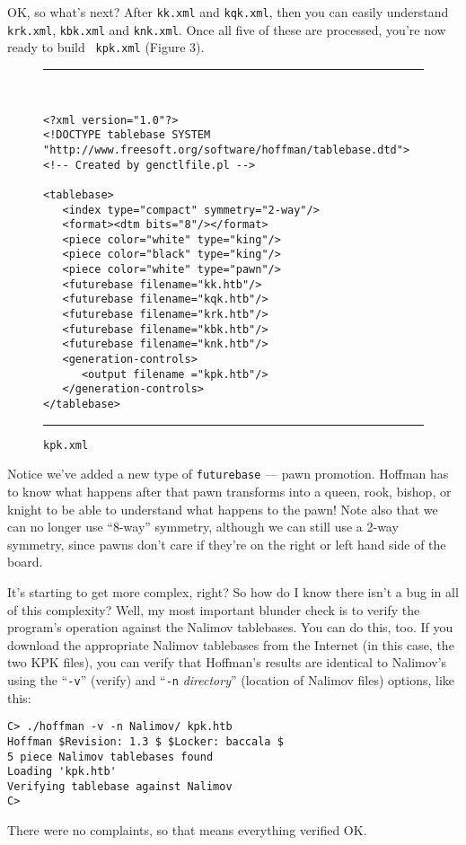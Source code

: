 \documentclass[11pt]{article}
\begin{document}
OK, so what's next?  After {\tt kk.xml} and {\tt kqk.xml}, then you
can easily understand {\tt krk.xml}, {\tt kbk.xml} and {\tt knk.xml}.
Once all five of these are processed, you're now ready to build {\tt
kpk.xml} (Figure 3).

\begin{figure}
\hrule\ 
{\small\begin{verbatim}
<?xml version="1.0"?>
<!DOCTYPE tablebase SYSTEM "http://www.freesoft.org/software/hoffman/tablebase.dtd">
<!-- Created by genctlfile.pl -->

<tablebase>
   <index type="compact" symmetry="2-way"/>
   <format><dtm bits="8"/></format>
   <piece color="white" type="king"/>
   <piece color="black" type="king"/>
   <piece color="white" type="pawn"/>
   <futurebase filename="kk.htb"/>
   <futurebase filename="kqk.htb"/>
   <futurebase filename="krk.htb"/>
   <futurebase filename="kbk.htb"/>
   <futurebase filename="knk.htb"/>
   <generation-controls>
      <output filename ="kpk.htb"/>
   </generation-controls>
</tablebase>
\end{verbatim}}
\hrule
\caption{\tt kpk.xml}
\end{figure}

Notice we've added a new type of {\tt futurebase} --- pawn promotion.
Hoffman has to know what happens after that pawn transforms into a
queen, rook, bishop, or knight to be able to understand what happens
to the pawn!  Note also that we can no longer use ``8-way'' symmetry,
although we can still use a 2-way symmetry, since pawns don't care if
they're on the right or left hand side of the board.

It's starting to get more complex, right?  So how do I know there
isn't a bug in all of this complexity?  Well, my most important
blunder check is to verify the program's operation against the Nalimov
tablebases.  You can do this, too.  If you download the appropriate
Nalimov tablebases from the Internet (in this case, the two KPK
files), you can verify that Hoffman's results are identical to
Nalimov's using the ``{\tt -v}'' (verify) and ``{\tt -n} {\it
directory}'' (location of Nalimov files) options, like this:

\begin{verbatim}
C> ./hoffman -v -n Nalimov/ kpk.htb
Hoffman $Revision: 1.3 $ $Locker: baccala $
5 piece Nalimov tablebases found
Loading 'kpk.htb'
Verifying tablebase against Nalimov
C>
\end{verbatim}

There were no complaints, so that means everything verified OK.
\end{document}
